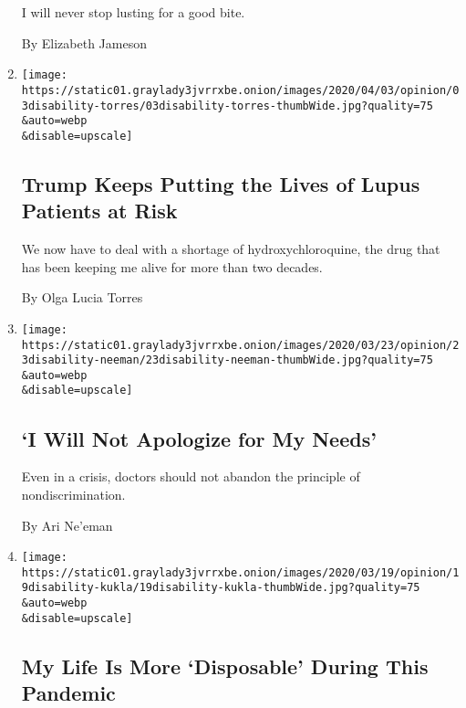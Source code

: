 \begin{enumerate}
  I will never stop lusting for a good bite.

  By Elizabeth Jameson
\item
  \href{/2020/04/06/opinion/coronavirus-hydroxychloroquine-lupus.html}{}

  \texttt{[image: https://static01.graylady3jvrrxbe.onion/images/2020/04/03/opinion/03disability-torres/03disability-torres-thumbWide.jpg?quality=75\\\&auto=webp\\\&disable=upscale]}

  \hypertarget{trump-keeps-putting-the-lives-of-lupus-patients-at-risk}{%
  \subsection{Trump Keeps Putting the Lives of Lupus Patients at
  Risk}\label{trump-keeps-putting-the-lives-of-lupus-patients-at-risk}}

  We now have to deal with a shortage of hydroxychloroquine, the drug
  that has been keeping me alive for more than two decades.

  By Olga Lucia Torres
\item
  \href{/2020/03/23/opinion/coronavirus-ventilators-triage-disability.html}{}

  \texttt{[image: https://static01.graylady3jvrrxbe.onion/images/2020/03/23/opinion/23disability-neeman/23disability-neeman-thumbWide.jpg?quality=75\\\&auto=webp\\\&disable=upscale]}

  \hypertarget{i-will-not-apologize-for-my-needs}{%
  \subsection{`I Will Not Apologize for My
  Needs'}\label{i-will-not-apologize-for-my-needs}}

  Even in a crisis, doctors should not abandon the principle of
  nondiscrimination.

  By Ari Ne'eman
\item
  \href{/2020/03/19/opinion/coronavirus-disabled-health-care.html}{}

  \texttt{[image: https://static01.graylady3jvrrxbe.onion/images/2020/03/19/opinion/19disability-kukla/19disability-kukla-thumbWide.jpg?quality=75\\\&auto=webp\\\&disable=upscale]}

  \hypertarget{my-life-is-more-disposable-during-this-pandemic}{%
  \subsection{My Life Is More `Disposable' During This
  Pandemic}\label{my-life-is-more-disposable-during-this-pandemic}}


\end{enumerate}
